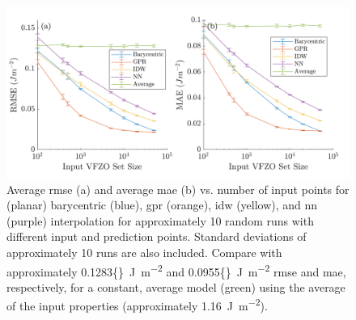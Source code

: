 \documentclass[final,twocolumn,12pt]{elsarticle}
\newcommand{\inpt}{input}
\newcommand{\outpt}{prediction}
\newcommand{\avgrmse}{0.1283}
\newcommand{\avgmae}{0.0955}
\begin{document}
{%

\begin{figure}
    \centering
    \includegraphics[scale=1]{brkerror.png}
    \caption{Average \gls{rmse} (a) and average \gls{mae} (b) vs. number of \inpt{} points for (planar) barycentric (blue), \gls{gpr} (orange), \gls{idw} (yellow), and \gls{nn} (purple) interpolation for approximately 10 random runs with different \inpt{} and \outpt{} points. Standard deviations of approximately 10 runs are also included. Compare with approximately \SI{\avgrmse{}}{\J\per\square\meter} and \SI{\avgmae{}}{\J\per\square\meter} \gls{rmse} and \gls{mae}, respectively, for a constant, average model (green) using the average of the \inpt{} properties (approximately \SI{1.16}{\J\per\square\meter}).}
    \label{fig:brkerror}
\end{figure}

}
\end{document}
